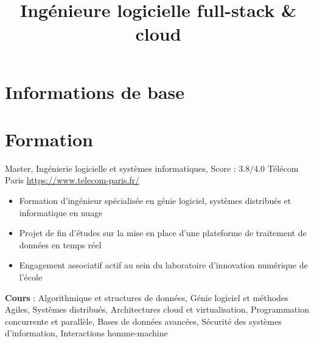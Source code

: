 \documentclass[a4paper, serif, 10pt]{moderncv}
\title{Ingénieure logicielle full-stack \& cloud}
\begin{document}
\maketitle

\section{Informations de base}

\section{Formation}

        {Master, Ingénierie logicielle et systèmes informatiques, Score : 3.8/4.0}
        {Télécom Paris}
        {\url{https://www.telecom-paris.fr/}}
        {}
        {\begin{itemize}
\item Formation d'ingénieur spécialisée en génie logiciel, systèmes distribués et informatique en nuage
\item Projet de fin d’études sur la mise en place d’une plateforme de traitement de données en temps réel
\item Engagement associatif actif au sein du laboratoire d’innovation numérique de l’école
\end{itemize}
\textbf{Cours} : Algorithmique et structures de données, Génie logiciel et méthodes Agiles, Systèmes distribués, Architectures cloud et virtualisation, Programmation concurrente et parallèle, Bases de données avancées, Sécurité des systèmes d'information, Interactions homme-machine}
\end{document}
